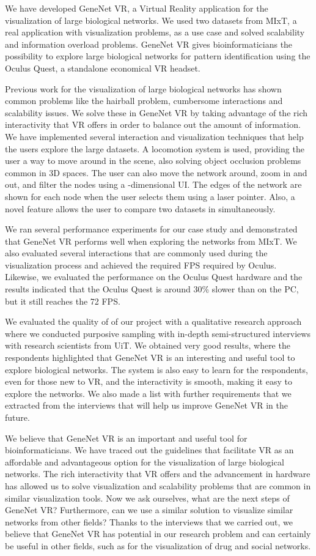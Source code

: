 We have developed GeneNet VR, a Virtual Reality application for the visualization of large biological networks. We used two datasets from MIxT, a real application with visualization problems, as a use case and solved scalability and information overload problems. GeneNet VR gives bioinformaticians the possibility to explore large biological networks for pattern identification using the Oculus Quest, a standalone economical VR headset.

Previous work for the visualization of large biological networks has shown common problems like the hairball problem, cumbersome interactions and scalability issues. We solve these in GeneNet VR by taking advantage of the rich interactivity that VR offers in order to balance out the amount of information. We have implemented several interaction and visualization techniques that help the users explore the large datasets. A locomotion system is used, providing the user a way to move around in the scene, also solving object occlusion problems common in 3D spaces. The user can also move the network around, zoom in and out, and filter the nodes using a -dimensional UI. The edges of the network are shown for each node when the user selects them using a laser pointer. Also, a novel feature allows the user to compare two datasets in simultaneously.

We ran several performance experiments for our case study and demonstrated that GeneNet VR performs well when exploring the networks from MIxT. We also evaluated several interactions that are commonly used during the visualization process and achieved the required FPS required by Oculus. Likewise, we evaluated the performance on the Oculus Quest hardware and the results indicated that the Oculus Quest is around 30\% slower than on the PC, but it still reaches the 72 FPS.

We evaluated the quality of of our project with a qualitative research approach where we conducted purposive sampling with in-depth semi-structured interviews with research scientists from UiT. We obtained very good results, where the respondents highlighted that GeneNet VR is an interesting and useful tool to explore biological networks. The system is also easy to learn for the respondents, even for those new to VR, and the interactivity is smooth, making it easy to explore the networks. We also made a list with further requirements that we extracted from the interviews that will help us improve GeneNet VR in the future.

We believe that GeneNet VR is an important and useful tool for bioinformaticians. We have traced out the guidelines that facilitate VR as an affordable and advantageous option for the visualization of large biological networks. The rich interactivity that VR offers and the advancement in hardware has allowed us to solve visualization and scalability problems that are common in similar visualization tools. Now we ask ourselves, what are the next steps of GeneNet VR? Furthermore, can we use a similar solution to visualize similar networks from other fields? Thanks to the interviews that we carried out, we believe that GeneNet VR has potential in our research problem and can certainly be useful in other fields, such as for the visualization of drug and social networks.
